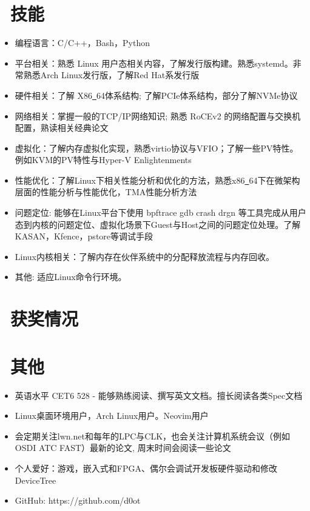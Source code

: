 \documentclass{resume}
\begin{document}
\section{\faCogs\ 技能}
\begin{itemize}[parsep=0.5ex]
  \item 编程语言：C/C++，Bash，Python
  \item 平台相关：熟悉 Linux 用户态相关内容，了解发行版构建。熟悉systemd。非常熟悉Arch Linux发行版，了解Red Hat系发行版
  \item 硬件相关：了解 X86\underline\ 64体系结构; 了解PCIe体系结构，部分了解NVMe协议
  \item 网络相关：掌握一般的TCP/IP网络知识; 熟悉 RoCEv2 的网络配置与交换机配置，熟读相关经典论文
  \item 虚拟化：了解内存虚拟化实现，熟悉virtio协议与VFIO；了解一些PV特性。例如KVM的PV特性与Hyper-V Enlightenments
  \item 性能优化：了解Linux下相关性能分析和优化的方法，熟悉x86\underline\ 64下在微架构层面的性能分析与性能优化，TMA性能分析方法
  \item 问题定位: 能够在Linux平台下使用 bpftrace gdb crash drgn 等工具完成从用户态到内核的问题定位、虚拟化场景下Guest与Host之间的问题定位处理。了解KASAN，Kfence，pstore等调试手段
  \item Linux内核相关：了解内存在伙伴系统中的分配释放流程与内存回收。
  \item 其他: 适应Linux命令行环境。
\end{itemize}


\section{\faHeartO\ 获奖情况}


\section{\faInfo\ 其他}
\begin{itemize}[parsep=0.5ex]
  \item 英语水平 CET6 528 - 能够熟练阅读、撰写英文文档。擅长阅读各类Spec文档
  \item Linux桌面环境用户，Arch Linux用户。Neovim用户
  \item 会定期关注lwn.net和每年的LPC与CLK，也会关注计算机系统会议（例如OSDI ATC FAST）最新的论文, 周末时间会阅读一些论文
  \item 个人爱好：游戏，嵌入式和FPGA、偶尔会调试开发板硬件驱动和修改DeviceTree
  \item GitHub: https://github.com/d0ot

\end{itemize}

%
%
\end{document}
